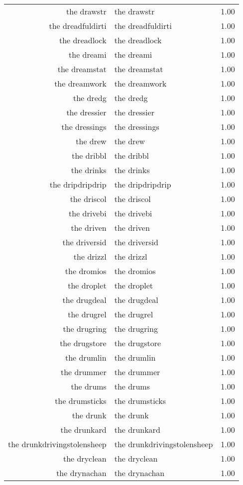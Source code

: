 \begin{table}[ht]
\begin{tabular}{rlr}
  the drawstr & the drawstr & 1.00 \\ 
  the dreadfuldirti & the dreadfuldirti & 1.00 \\ 
  the dreadlock & the dreadlock & 1.00 \\ 
  the dreami & the dreami & 1.00 \\ 
  the dreamstat & the dreamstat & 1.00 \\ 
  the dreamwork & the dreamwork & 1.00 \\ 
  the dredg & the dredg & 1.00 \\ 
  the dressier & the dressier & 1.00 \\ 
  the dressings & the dressings & 1.00 \\ 
  the drew & the drew & 1.00 \\ 
  the dribbl & the dribbl & 1.00 \\ 
  the drinks & the drinks & 1.00 \\ 
  the dripdripdrip & the dripdripdrip & 1.00 \\ 
  the driscol & the driscol & 1.00 \\ 
  the drivebi & the drivebi & 1.00 \\ 
  the driven & the driven & 1.00 \\ 
  the driversid & the driversid & 1.00 \\ 
  the drizzl & the drizzl & 1.00 \\ 
  the dromios & the dromios & 1.00 \\ 
  the droplet & the droplet & 1.00 \\ 
  the drugdeal & the drugdeal & 1.00 \\ 
  the drugrel & the drugrel & 1.00 \\ 
  the drugring & the drugring & 1.00 \\ 
  the drugstore & the drugstore & 1.00 \\ 
  the drumlin & the drumlin & 1.00 \\ 
  the drummer & the drummer & 1.00 \\ 
  the drums & the drums & 1.00 \\ 
  the drumsticks & the drumsticks & 1.00 \\ 
  the drunk & the drunk & 1.00 \\ 
  the drunkard & the drunkard & 1.00 \\ 
  the drunkdrivingstolensheep & the drunkdrivingstolensheep & 1.00 \\ 
  the dryclean & the dryclean & 1.00 \\ 
  the drynachan & the drynachan & 1.00 \\ 

\end{tabular}
\end{table}
